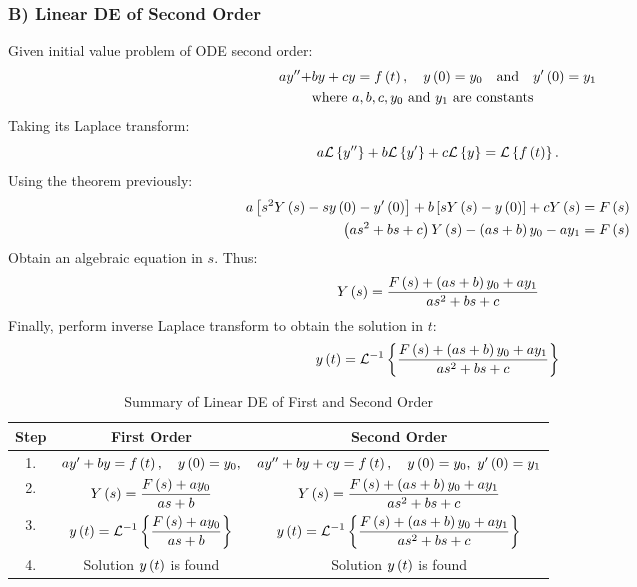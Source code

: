 \subsubsection*{B) Linear DE of Second Order}
Given initial value problem of ODE second order:
\begin{align}
    ay''+&by+cy=f\left(t\right),\quad y\left(0\right)=y_0\quad\text{and}\quad y'\left(0\right)=y_1\\
    &\text{where }a,b,c,y_0\text{ and }y_1\text{ are constants}\nonumber
\end{align}
Taking its Laplace transform:
\begin{equation}
    a\mathcal{L}\left\{y''\right\}+b\mathcal{L}\left\{y'\right\}+c\mathcal{L}\left\{y\right\}=\mathcal{L}\left\{f\left(t\right)\right\}.
\end{equation}
Using the theorem previously:
\begin{align*}
    a\left[s^2Y\left(s\right)-sy\left(0\right)-y'\left(0\right)\right]+b\left[sY\left(s\right)-y\left(0\right)\right]+cY\left(s\right)&=F\left(s\right)\\
    \left(as^2+bs+c\right)Y\left(s\right)-\left(as+b\right)y_0-ay_1&=F\left(s\right)
\end{align*}
Obtain an algebraic equation in $s$. Thus:
\begin{equation}
    Y\left(s\right)=\frac{F\left(s\right)+\left(as+b\right)y_0+ay_1}{as^2+bs+c}
\end{equation}
Finally, perform inverse Laplace transform to obtain the solution in $t$:
\begin{equation}
    y\left(t\right)=\mathcal{L}^{-1}\left\{\frac{F\left(s\right)+\left(as+b\right)y_0+ay_1}{as^2+bs+c}\right\}
\end{equation}
\begin{table}[H]
    \centering
    \renewcommand{\arraystretch}{2.2}
    \caption{Summary of Linear DE of First and Second Order}
    \label{table:2.4}
    \begin{tabular}{|c|c|c|}\hline
       Step&First Order&Second Order\\\hline
       1.&$ay'+by=f\left(t\right),\quad y\left(0\right)=y_0,$&$ay''+by+cy=\f{t},\quad\y{0}=y_0,\ y'\bracket{0}=y_1$\\
       2.&$\displaystyle Y\left(s\right)=\frac{F\left(s\right)+ay_0}{as+b}$&$Y\left(s\right)=\displaystyle\frac{F\left(s\right)+\left(as+b\right)y_0+ay_1}{as^2+bs+c}$\\
       3.&$\displaystyle y\left(t\right)=\mathcal{L}^{-1}\left\{\frac{F\left(s\right)+ay_0}{as+b}\right\}$&$\displaystyle y\left(t\right)=\mathcal{L}^{-1}\left\{\frac{F\left(s\right)+\left(as+b\right)y_0+ay_1}{as^2+bs+c}\right\}$\\
       4.&Solution $y\left(t\right)$ is found&Solution $y\left(t\right)$ is found\\\hline
    \end{tabular}
\end{table}
